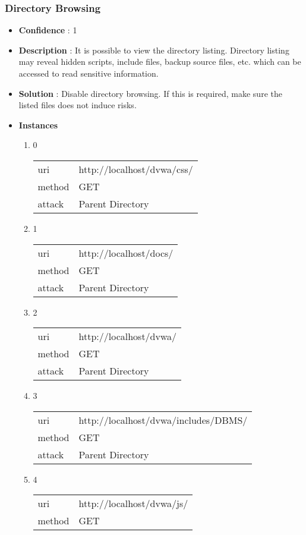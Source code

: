 \documentclass[10pt]{article}
\begin{document}
\subsubsection{Directory Browsing}
\begin{itemize}
\item[] \textbf{Confidence} : 1
\item[] \textbf{Description} : It is possible to view the directory listing.  Directory listing may reveal hidden scripts, include files, backup source files, etc. which can be accessed to read sensitive information.
\item[] \textbf{Solution} :  Disable directory browsing.  If this is required, make sure the listed files does not induce risks.
\item[] \textbf{Instances}
\begin{enumerate}
\item[] 0
\begin{tabular}{| l | p{12cm}}
uri & http://localhost/dvwa/css/ \\
method & GET \\
attack & Parent Directory \\
\end{tabular}
\item[] 1
\begin{tabular}{| l | p{12cm}}
uri & http://localhost/docs/ \\
method & GET \\
attack & Parent Directory \\
\end{tabular}
\item[] 2
\begin{tabular}{| l | p{12cm}}
uri & http://localhost/dvwa/ \\
method & GET \\
attack & Parent Directory \\
\end{tabular}
\item[] 3
\begin{tabular}{| l | p{12cm}}
uri & http://localhost/dvwa/includes/DBMS/ \\
method & GET \\
attack & Parent Directory \\
\end{tabular}
\item[] 4
\begin{tabular}{| l | p{12cm}}
uri & http://localhost/dvwa/js/ \\
method & GET \\

\end{tabular}
\end{enumerate}
\end{itemize}
\end{document}
